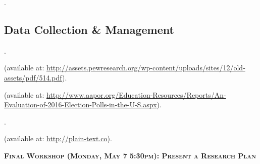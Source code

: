\documentclass[11pt]{syllabus}
\begin{document}
\begin{readings}
\item {}.
\end{readings}

\subsection{Data Collection \& Management}
\begin{readings}
\item {}.
\item {} (available at: \url{http://assets.pewresearch.org/wp-content/uploads/sites/12/old-assets/pdf/514.pdf}).
\item {} (available at: \url{http://www.aapor.org/Education-Resources/Reports/An-Evaluation-of-2016-Election-Polls-in-the-U-S.aspx}).
\end{readings}

\begin{readings}
\item {}.
\end{readings}

\begin{readings}
\item {}
\item {}
\item {}
\end{readings}

\begin{readings}
\item {} (available at: \url{http://plain-text.co}).
\end{readings}

\vspace{.5\baselineskip}
\noindent \textbf{\textsc{Final Workshop (Monday, May 7 5:30pm): Present a Research Plan}}



%
\end{document}
